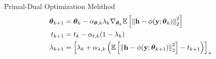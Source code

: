 \documentclass[hyperref={bookmarks=false}]{beamer}
\numberwithin{figure}{section}
\begin{document}
\begin{frame}[allowframebreaks]{Primal-Dual Optimization Mehthod}
\begin{equation*}
    \begin{split}
        \boldsymbol{\theta}_{k+1} &= \boldsymbol{\theta}_{k} - 
            \alpha_{\boldsymbol{\theta},k} \lambda_k \nabla_{\boldsymbol{\theta}_k}
            \mathbb{E}\left[\left\| {\bf h}-\phi(\mathbf{y};\boldsymbol{\theta}_k) \right\|^2_2 \right]\\
        t_{k+1} &= t_{k} - \alpha_{t,k}(1-\lambda_k)\\
        \lambda_{k+1} &= \left[ \lambda_k + \alpha_{\lambda,k}
            \left( \mathbb{E}\left[\left\| {\bf h}-\phi(\mathbf{y};\boldsymbol{\theta}_{k+1}) \right\|^2_2 \right] 
            -t_{k+1}\right)\right]_{+}
    \end{split}
\end{equation*}

\end{frame}
\end{document}
